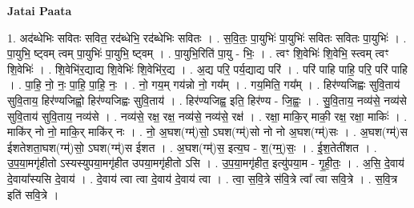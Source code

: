 \documentclass[17pt]{extarticle}
\begin{document}
\textbf{Jatai Paata} \newline

1. अद॑ब्धेभिः सवितः सवित॒ रद॑ब्धेभि॒ रद॑ब्धेभिः सवितः । . स॒वि॒तः॒ पा॒युभिः॑ पा॒युभिः॑ सवितः सवितः पा॒युभिः॑ । . पा॒युभि॒ ष्ट्वम् त्वम् पा॒युभिः॑ पा॒युभि॒ ष्ट्वम् । . पा॒युभि॒रिति॑ पा॒यु - भिः॒ । . त्वꣳ शि॒वेभिः॑ शि॒वेभि॒ स्त्वम् त्वꣳ शि॒वेभिः॑ । . शि॒वेभि॑र॒द्याद्य शि॒वेभिः॑ शि॒वेभि॑र॒द्य । . अ॒द्य परि॒ पर्य॒द्याद्य परि॑ । . परि॑ पाहि पाहि॒ परि॒ परि॑ पाहि । . पा॒हि॒ नो॒ नः॒ पा॒हि॒ पा॒हि॒ नः॒ । . नो॒ गय॒म् गय॑न्नो नो॒ गय᳚म् । . गय॒मिति॒ गय᳚म् । . हिर॑ण्यजिह्वः सुवि॒ताय॑ सुवि॒ताय॒ हिर॑ण्यजिह्वो॒ हिर॑ण्यजिह्वः सुवि॒ताय॑ । . हिर॑ण्यजिह्व॒ इति॒ हिर॑ण्य - जि॒ह्वः॒ । . सु॒वि॒ताय॒ नव्य॑से॒ नव्य॑से सुवि॒ताय॑ सुवि॒ताय॒ नव्य॑से । . नव्य॑से॒ रक्ष॒ रक्ष॒ नव्य॑से॒ नव्य॑से॒ रक्ष॑ । . रक्षा॒ माकि॒र् माकी॒ रक्ष॒ रक्षा॒ माकिः॑ । . माकि॑र् नो नो॒ माकि॒र् माकि॑र् नः । . नो॒ अ॒घश(ग्म्॑)सो॒ ऽघश(ग्म्॑)सो नो नो अ॒घश(ग्म्॑)सः । . अ॒घश(ग्म्॑)स ईशतेशता॒घश(ग्म्॑)सो॒ ऽघश(ग्म्॑)स ईशत । . अ॒घश(ग्म्॑)स॒ इत्य॒घ - श॒(ग्म्॒)सः॒ । . ई॒श॒तेती॑शत । . उ॒प॒या॒मगृ॑हीतो ऽस्यस्युपया॒मगृ॑हीत उपया॒मगृ॑हीतो ऽसि । . उ॒प॒या॒मगृ॑हीत॒ इत्यु॑पया॒म - गृ॒ही॒तः॒ । . अ॒सि॒ दे॒वाय॑ दे॒वाया᳚स्यसि दे॒वाय॑ । . दे॒वाय॑ त्वा त्वा दे॒वाय॑ दे॒वाय॑ त्वा । . त्वा॒ स॒वि॒त्रे स॑वि॒त्रे त्वा᳚ त्वा सवि॒त्रे । . स॒वि॒त्र इति॑ सवि॒त्रे । \newline
\end{document}
